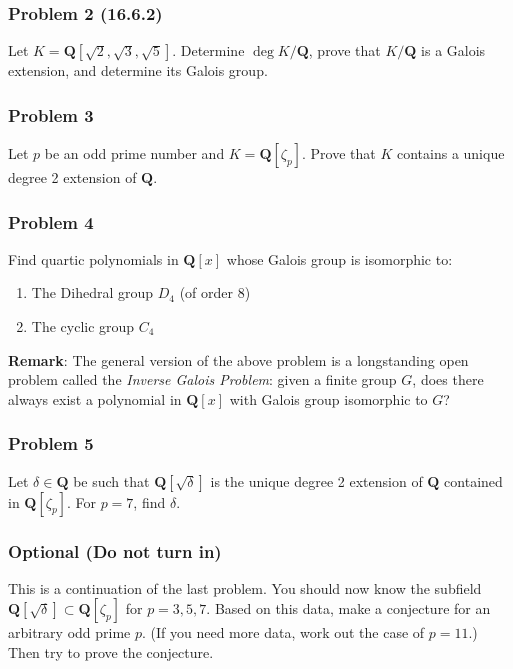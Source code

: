 \documentclass[11pt]{article}
\begin{document}
\subsubsection{Problem 2 (16.6.2)}
\label{sec:org30e6928}

Let \(K = \mathbf{Q}[\sqrt 2, \sqrt 3, \sqrt 5]\).
Determine \(\deg K / \mathbf{Q}\), prove that \(K/ \mathbf{Q}\) is a Galois extension, and determine its Galois group.
\subsubsection{Problem 3}
\label{sec:org59d394d}

Let \(p\) be an odd prime number and \(K = \mathbf{Q}[\zeta_{p}]\).
Prove that \(K\) contains a unique degree 2 extension of \(\mathbf{Q}\).
\subsubsection{Problem 4}
\label{sec:org71b88de}

Find quartic polynomials in \(\mathbf{Q}[x]\) whose Galois group is isomorphic to:
\begin{enumerate}
\item The Dihedral group \(D_4\) (of order 8)
\item The cyclic group \(C_4\)
\end{enumerate}

\textbf{Remark}: The general version of the above problem is a longstanding open problem called the \emph{Inverse Galois Problem}: given a finite group \(G\), does there always exist a polynomial in \(\mathbf{Q}[x]\) with Galois group isomorphic to \(G\)?
\subsubsection{Problem 5}
\label{sec:orgbc8aa92}

Let \(\delta \in \mathbf{Q}\) be such that \(\mathbf{Q}[\sqrt \delta]\) is the unique degree 2 extension of \(\mathbf{Q}\) contained in \(\mathbf{Q}[\zeta_{p}]\).
For \(p = 7\), find \(\delta\).
\subsubsection{Optional (Do not turn in)}
\label{sec:org1b23f26}

This is a continuation of the last problem.
You should now know the subfield \(\mathbf{Q}[\sqrt \delta] \subset \mathbf{Q}[\zeta_p]\) for \(p = 3, 5, 7\).
Based on this data, make a conjecture for an arbitrary odd prime \(p\).
(If you need more data, work out the case of \(p = 11\).)
Then try to prove the conjecture.
\end{document}
